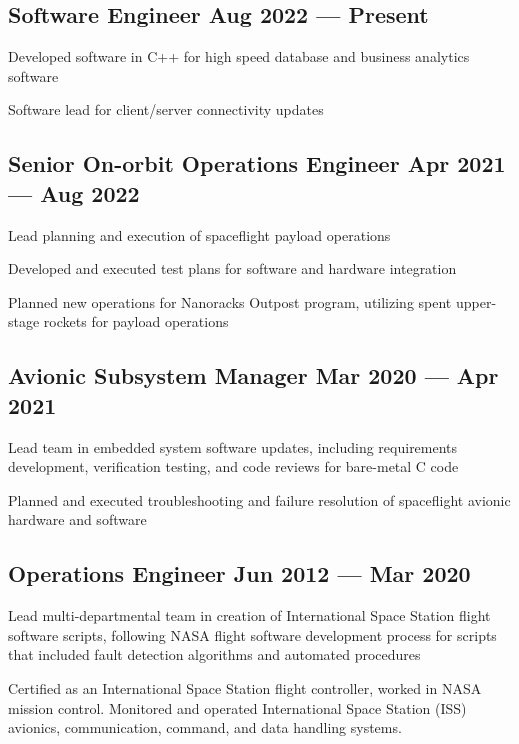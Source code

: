 \documentclass[letter,10pt]{article}
\begin{document}
\subsection{{Software Engineer \hfill Aug 2022 --- Present}}
\begin{zitemize}
\item Developed software in C++ for high speed database and business analytics software
\item Software lead for client/server connectivity updates
\end{zitemize}

\subsection{{Senior On-orbit Operations Engineer \hfill Apr 2021 --- Aug 2022}}
\begin{zitemize}
\item Lead planning and execution of spaceflight payload operations
\item Developed and executed test plans for software and hardware integration
\item Planned new operations for Nanoracks Outpost program, utilizing spent upper-stage rockets for payload operations
\end{zitemize}

\subsection{{Avionic Subsystem Manager \hfill Mar 2020 --- Apr 2021}}
\begin{zitemize}
\item Lead team in embedded system software updates, including requirements development, verification testing, and code reviews for bare-metal C code
\item Planned and executed troubleshooting and failure resolution of spaceflight avionic hardware and software
\end{zitemize}

\subsection{{Operations Engineer \hfill Jun 2012 --- Mar 2020}}
\begin{zitemize}
\item Lead multi-departmental team in creation of International Space Station flight software scripts, following NASA flight software development process for scripts that included fault detection algorithms and automated procedures
\item Certified as an International Space Station flight controller, worked in NASA mission control.
Monitored and operated International Space Station (ISS) avionics, communication, command, and
data handling systems.
\end{zitemize}
\end{document}
